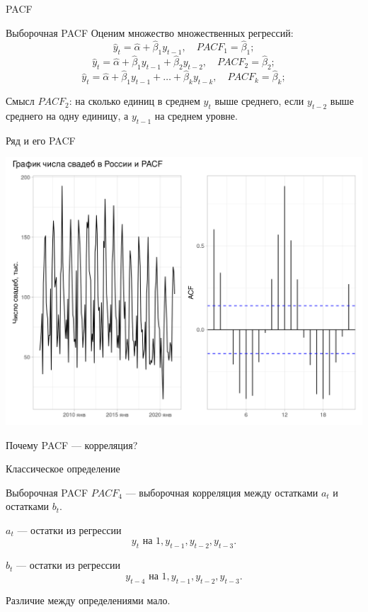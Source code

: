 \begin{frame}{PACF}

  \begin{block}{Выборочная PACF}
    Оценим множество множественных регрессий:
    \[
    \hat y_t = \hat\alpha + \hat\beta_1 y_{t-1}, \quad PACF_1 = \hat\beta_1;
    \]
    \pause
    \[
      \hat y_t = \hat\alpha  + \hat\beta_1 y_{t-1} + \hat\beta_2 y_{t-2}, \quad PACF_2 = \hat\beta_2;
    \]
    \pause
    \[
      \hat y_t = \hat\alpha + \hat\beta_1 y_{t-1} + \ldots + \hat\beta_k y_{t-k}, \quad PACF_k = \hat\beta_k;
    \]
  \end{block}
  
  \pause
  \alert{Смысл}
  $PACF_2$: на сколько единиц в среднем $y_t$ выше среднего, если $y_{t-2}$ выше среднего на одну единицу,
  а $y_{t-1}$ на среднем уровне.

  \end{frame}
  
  \begin{frame}{Ряд и его PACF}

    \includegraphics[width=\textwidth]{pictures/om_ts_01-127.png}
    
  \end{frame}
    
  \begin{frame}{Почему PACF — корреляция?}

    \alert{Классическое определение}
  
    \begin{block}{Выборочная PACF}
      $PACF_4$ — выборочная корреляция между остатками $a_t$ и остатками $b_t$.

      $a_t$ — остатки из регрессии
      \[
        y_t \text{ на } 1, y_{t-1}, y_{t-2}, y_{t-3}.
      \]

      $b_t$ — остатки из регрессии
      \[
        y_{t-4} \text{ на } 1, y_{t-1}, y_{t-2}, y_{t-3}.
      \]
    \end{block}
  
  \pause
  Различие между определениями \alert{мало}. 
  
  \end{frame}
  


